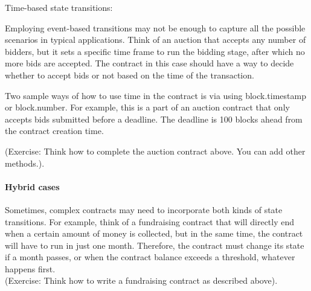 \documentclass[12pt]{article}
\begin{document}
Time-based state transitions: 

Employing event-based transitions may not be enough to capture all the possible scenarios in typical applications. Think of an auction that accepts any number of bidders, but it sets a specific time frame to run the bidding stage, after which no more bids are accepted. The contract in this case should have a way to decide whether to accept bids or not based on the time of the transaction.

Two sample ways of how to use time in the contract is via using block.timestamp or block.number. For example, this is a part of an auction contract that only accepts bids submitted before a deadline. The deadline is 100 blocks ahead from the contract creation time.


(Exercise: Think how to complete the auction contract above. You can add other methods.).

\paragraph{Hybrid cases}

Sometimes, complex contracts may need to incorporate both kinds of state transitions. For example, think of a fundraising contract that will directly end when a certain amount of money is collected, but in the same time, the contract will have to run in just one month. Therefore, the contract must change its state if a month passes, or when the contract balance exceeds a threshold, whatever happens first.\\

(Exercise: Think how to write a fundraising contract as described above).
\end{document}
